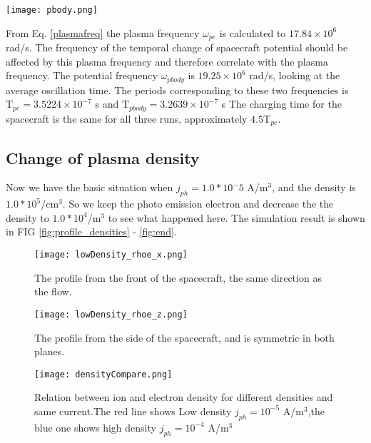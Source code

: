 \documentclass[aip, 
rsi, 
amsmath,
amssymb,
longbibliography,
preprint]{revtex4-1}
\begin{document}
\begin{figure*}
\texttt{[image: pbody.png]}
\caption{The change in the spacecraft potential over time. Data from one simulation with no photo emission, and two simulations with photo emission from the wake side on the body. $j_{ph}$ is the photo emission density in A/m$^3$. \label{fig:potential_time}}
\end{figure*}

From Eq. \ref{plasmafreq} the plasma frequency $\omega_{pe}$ is calculated to $17.84 \times 10^6$ rad/s. The frequency of the temporal change of spacecraft potential should be affected by this plasma frequency and therefore correlate with the plasma frequency. The potential frequency $\omega_{pbody}$ is $19.25 \times 10^6$ rad/s, looking at the average oscillation time. The periods corresponding to these two frequencies is $\mathrm{T}_{pe} = 3.5224 \times 10^{-7}$ s and $\mathrm{T}_{pbody} = 3.2639 \times 10^{-7}$ s The charging time for the spacecraft is the same for all three runs, approximately $4.5\mathrm{T}_{pe}$.

\subsection{Change of plasma density}

Now we have the basic situation when $j_{ph}= 1.0*10^-5$ A/m$^3$, and the density is $1.0*10^5$/cm$^3$. So we keep the photo emission electron and decrease the the density to $1.0*10^4$/m$^3$ to see what happened here. The simulation result is shown in FIG \ref{fig:profile_densities} - \ref{fig:end}.

\begin{figure*}[!ht]
\begin{subfigure}{0.45\textwidth}
\texttt{[image: lowDensity\_rhoe\_x.png]}
\caption{The profile from the front of the spacecraft, the same direction as the flow.}
\end{subfigure}
\begin{subfigure}{0.45\textwidth}
\texttt{[image: lowDensity\_rhoe\_z.png]}
\caption{The profile from the side of the spacecraft, and is symmetric in both planes.}
\end{subfigure}
\caption{The situation when we have lowered the density by an order of 1 and the photo emission is $j_{ph} = 10^{-5}$ A/m$^3$} \label{fig:profile_densities}
\end{figure*}

\begin{figure}[!ht]
\texttt{[image: densityCompare.png]}
\caption{Relation between ion and electron density for different densities and same current.The red line shows Low density $j_{ph} = 10^{-5}$ A/m$^3$,the blue one shows high density $j_{ph} = 10^{-4}$ A/m$^3$}
\end{figure}
\end{document}
